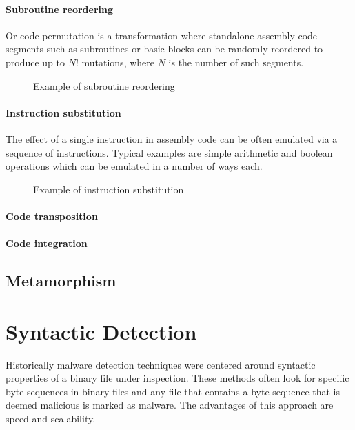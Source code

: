\paragraph*{Subroutine reordering}
Or code permutation is a transformation where standalone assembly code segments such as subroutines or basic blocks can be randomly reordered to produce up to $N!$ mutations, where $N$ is the number of such segments.

\begin{figure}[H]
    \centering
    \caption{Example of subroutine reordering}
    \label{fig_comp}
\end{figure}

\paragraph*{Instruction substitution}
The effect of a single instruction in assembly code can be often emulated via a sequence of instructions. Typical examples are simple arithmetic and boolean operations which can be emulated in a number of ways each.

\begin{figure}[H]
    \centering
    \caption{Example of instruction substitution}
    \label{fig_comp}
\end{figure}

\paragraph*{Code transposition}
\paragraph*{Code integration}

\subsection{Metamorphism}
\section{Syntactic Detection}
Historically malware detection techniques were centered around syntactic properties of a binary file under inspection. These methods often look for specific byte sequences in binary files and any file that contains a byte sequence that is deemed malicious is marked as malware. The advantages of this approach are speed and scalability. 
